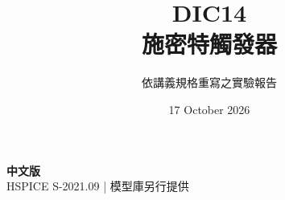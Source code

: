 \documentclass[11pt,a4paper]{article}
\title{\color{accent}DIC14\\[4pt]施密特觸發器}
\author{依講義規格重寫之實驗報告}
\date{17 October 2026}
\begin{document}
\maketitle
\begin{center}\small\textbf{中文版}\\
HSPICE S-2021.09 \quad | \quad 模型庫另行提供
\end{center}


\end{document}
